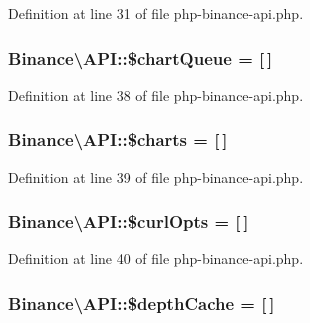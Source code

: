 Definition at line 31 of file php-\/binance-\/api.\-php.

\hypertarget{classBinance_1_1API_aaa75d873054290eecf1dd2876237a279}{
\subsubsection[{\$chart\-Queue}]{\setlength{\rightskip}{0pt plus 5cm}Binance\textbackslash{}\-A\-P\-I\-::\$chart\-Queue = \mbox{[}$\,$\mbox{]}\hspace{0.3cm}{\ttfamily [protected]}}}\label{classBinance_1_1API_aaa75d873054290eecf1dd2876237a279}


Definition at line 38 of file php-\/binance-\/api.\-php.

\hypertarget{classBinance_1_1API_a0c2d0cd199527b3b275143c49d91702e}{
\subsubsection[{\$charts}]{\setlength{\rightskip}{0pt plus 5cm}Binance\textbackslash{}\-A\-P\-I\-::\$charts = \mbox{[}$\,$\mbox{]}\hspace{0.3cm}{\ttfamily [protected]}}}\label{classBinance_1_1API_a0c2d0cd199527b3b275143c49d91702e}


Definition at line 39 of file php-\/binance-\/api.\-php.

\hypertarget{classBinance_1_1API_ace9645947686e99baf916e3bc189aeaf}{
\subsubsection[{\$curl\-Opts}]{\setlength{\rightskip}{0pt plus 5cm}Binance\textbackslash{}\-A\-P\-I\-::\$curl\-Opts = \mbox{[}$\,$\mbox{]}\hspace{0.3cm}{\ttfamily [protected]}}}\label{classBinance_1_1API_ace9645947686e99baf916e3bc189aeaf}


Definition at line 40 of file php-\/binance-\/api.\-php.

\hypertarget{classBinance_1_1API_a69d62e886266a59b0a314cb4f5f164ca}{
\subsubsection[{\$depth\-Cache}]{\setlength{\rightskip}{0pt plus 5cm}Binance\textbackslash{}\-A\-P\-I\-::\$depth\-Cache = \mbox{[}$\,$\mbox{]}\hspace{0.3cm}{\ttfamily [protected]}}}\label{classBinance_1_1API_a69d62e886266a59b0a314cb4f5f164ca}


